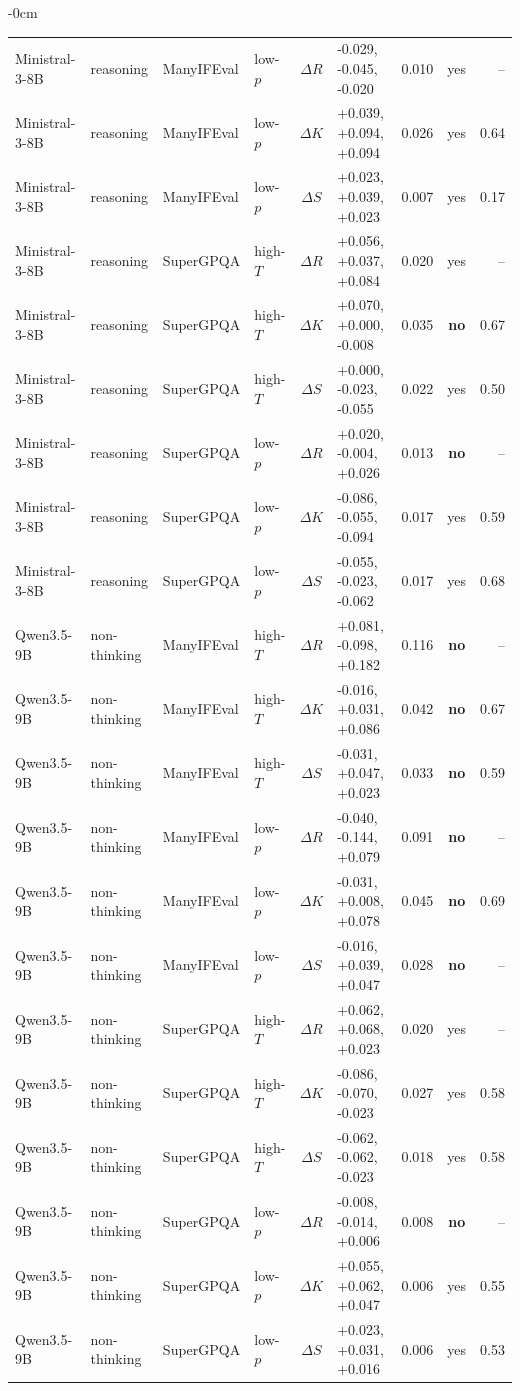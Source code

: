 \begin{table}[H]
\begin{adjustwidth}{-\extralength}{0cm}
\begin{tabular}{llllclccr}
Ministral-3-8B & reasoning & ManyIFEval & low-$p$ & $\Delta R$ & -0.029, -0.045, -0.020 & 0.010 & yes & -- \tabularnewline
Ministral-3-8B & reasoning & ManyIFEval & low-$p$ & $\Delta K$ & +0.039, +0.094, +0.094 & 0.026 & yes & 0.64 \tabularnewline
Ministral-3-8B & reasoning & ManyIFEval & low-$p$ & $\Delta S$ & +0.023, +0.039, +0.023 & 0.007 & yes & 0.17 \tabularnewline
Ministral-3-8B & reasoning & SuperGPQA & high-$T$ & $\Delta R$ & +0.056, +0.037, +0.084 & 0.020 & yes & -- \tabularnewline
Ministral-3-8B & reasoning & SuperGPQA & high-$T$ & $\Delta K$ & +0.070, +0.000, -0.008 & 0.035 & \textbf{no} & 0.67 \tabularnewline
Ministral-3-8B & reasoning & SuperGPQA & high-$T$ & $\Delta S$ & +0.000, -0.023, -0.055 & 0.022 & yes & 0.50 \tabularnewline
Ministral-3-8B & reasoning & SuperGPQA & low-$p$ & $\Delta R$ & +0.020, -0.004, +0.026 & 0.013 & \textbf{no} & -- \tabularnewline
Ministral-3-8B & reasoning & SuperGPQA & low-$p$ & $\Delta K$ & -0.086, -0.055, -0.094 & 0.017 & yes & 0.59 \tabularnewline
Ministral-3-8B & reasoning & SuperGPQA & low-$p$ & $\Delta S$ & -0.055, -0.023, -0.062 & 0.017 & yes & 0.68 \tabularnewline
Qwen3.5-9B & non-thinking & ManyIFEval & high-$T$ & $\Delta R$ & +0.081, -0.098, +0.182 & 0.116 & \textbf{no} & -- \tabularnewline
Qwen3.5-9B & non-thinking & ManyIFEval & high-$T$ & $\Delta K$ & -0.016, +0.031, +0.086 & 0.042 & \textbf{no} & 0.67 \tabularnewline
Qwen3.5-9B & non-thinking & ManyIFEval & high-$T$ & $\Delta S$ & -0.031, +0.047, +0.023 & 0.033 & \textbf{no} & 0.59 \tabularnewline
Qwen3.5-9B & non-thinking & ManyIFEval & low-$p$ & $\Delta R$ & -0.040, -0.144, +0.079 & 0.091 & \textbf{no} & -- \tabularnewline
Qwen3.5-9B & non-thinking & ManyIFEval & low-$p$ & $\Delta K$ & -0.031, +0.008, +0.078 & 0.045 & \textbf{no} & 0.69 \tabularnewline
Qwen3.5-9B & non-thinking & ManyIFEval & low-$p$ & $\Delta S$ & -0.016, +0.039, +0.047 & 0.028 & \textbf{no} & -- \tabularnewline
Qwen3.5-9B & non-thinking & SuperGPQA & high-$T$ & $\Delta R$ & +0.062, +0.068, +0.023 & 0.020 & yes & -- \tabularnewline
Qwen3.5-9B & non-thinking & SuperGPQA & high-$T$ & $\Delta K$ & -0.086, -0.070, -0.023 & 0.027 & yes & 0.58 \tabularnewline
Qwen3.5-9B & non-thinking & SuperGPQA & high-$T$ & $\Delta S$ & -0.062, -0.062, -0.023 & 0.018 & yes & 0.58 \tabularnewline
Qwen3.5-9B & non-thinking & SuperGPQA & low-$p$ & $\Delta R$ & -0.008, -0.014, +0.006 & 0.008 & \textbf{no} & -- \tabularnewline
Qwen3.5-9B & non-thinking & SuperGPQA & low-$p$ & $\Delta K$ & +0.055, +0.062, +0.047 & 0.006 & yes & 0.55 \tabularnewline
Qwen3.5-9B & non-thinking & SuperGPQA & low-$p$ & $\Delta S$ & +0.023, +0.031, +0.016 & 0.006 & yes & 0.53 \tabularnewline

\end{tabular}
\end{adjustwidth}
\end{table}
